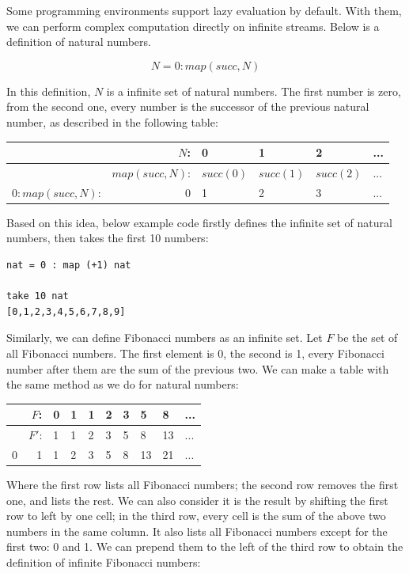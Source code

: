 \documentclass{article}
\begin{document}
Some programming environments support lazy evaluation by default. With them, we can perform complex computation directly on infinite streams. Below is a definition of natural numbers.

\[
N = 0 : map(succ, N)
\]

In this definition, $N$ is a infinite set of natural numbers. The first number is zero, from the second one, every number is the successor of the previous natural number, as described in the following table:

\vspace{5mm}
\begin{tabular}{|r|r|l|l|l|l|}
\hline
                 & $N$: & 0 & 1 & 2 & ... \\
\hline
                 & $map(succ, N)$: & $succ(0)$ & $succ(1)$ & $succ(2)$ & ... \\
\hline
$0 : map(succ, N)$: & 0 & 1 & 2 & 3 & ... \\
\hline
\end{tabular}
\vspace{5mm}

Based on this idea, below example code firstly defines the infinite set of natural numbers, then takes the first 10 numbers:

\lstset{frame=single}
\begin{lstlisting}
nat = 0 : map (+1) nat

take 10 nat
[0,1,2,3,4,5,6,7,8,9]
\end{lstlisting}

Similarly, we can define Fibonacci numbers as an infinite set. Let $F$ be the set of all Fibonacci numbers. The first element is 0, the second is 1, every Fibonacci number after them are the sum of the previous two. We can make a table with the same method as we do for natural numbers:

\vspace{5mm}
\begin{tabular}{|r|r|l|l|l|l|l|l|l|l|}
\hline
  & $F$:  & 0 & 1 & 1 & 2 & 3 & 5 & 8 & ... \\
\hline
  & $F'$: & 1 & 1 & 2 & 3 & 5 & 8 & 13 & ... \\
\hline
0 & 1     & 1 & 2 & 3 & 5 & 8 & 13 & 21 & ... \\
\hline
\end{tabular}
\vspace{5mm}

Where the first row lists all Fibonacci numbers; the second row removes the first one, and lists the rest. We can also consider it is the result by shifting the first row to left by one cell; in the third row, every cell is the sum of the above two numbers in the same column. It also lists all Fibonacci numbers except for the first two: 0 and 1. We can prepend them to the left of the third row to obtain the definition of infinite Fibonacci numbers:
\end{document}
